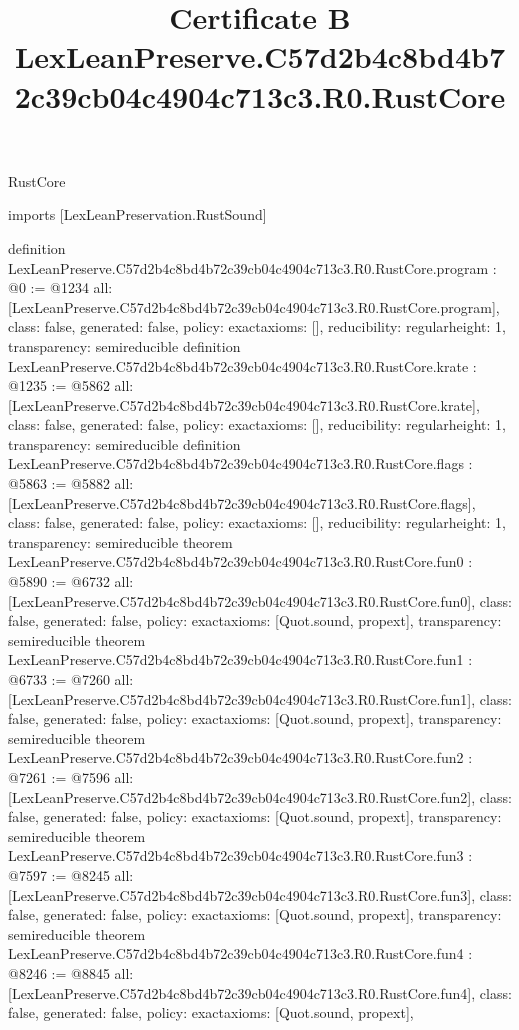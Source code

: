 \begin{lexlean}{RustCore}
\title{Certificate B LexLeanPreserve.C57d2b4c8bd4b72c39cb04c4904c713c3.R0.RustCore}
\begin{coremodule}
imports [LexLeanPreservation.RustSound]

definition LexLeanPreserve.C57d2b4c8bd4b72c39cb04c4904c713c3.R0.RustCore.program : @0 := @1234 {
  all: [LexLeanPreserve.C57d2b4c8bd4b72c39cb04c4904c713c3.R0.RustCore.program],
  class: false,
  generated: false,
  policy: exact{axioms: []},
  reducibility: regular{height: 1},
  transparency: semireducible
}
definition LexLeanPreserve.C57d2b4c8bd4b72c39cb04c4904c713c3.R0.RustCore.krate : @1235 := @5862 {
  all: [LexLeanPreserve.C57d2b4c8bd4b72c39cb04c4904c713c3.R0.RustCore.krate],
  class: false,
  generated: false,
  policy: exact{axioms: []},
  reducibility: regular{height: 1},
  transparency: semireducible
}
definition LexLeanPreserve.C57d2b4c8bd4b72c39cb04c4904c713c3.R0.RustCore.flags : @5863 := @5882 {
  all: [LexLeanPreserve.C57d2b4c8bd4b72c39cb04c4904c713c3.R0.RustCore.flags],
  class: false,
  generated: false,
  policy: exact{axioms: []},
  reducibility: regular{height: 1},
  transparency: semireducible
}
theorem LexLeanPreserve.C57d2b4c8bd4b72c39cb04c4904c713c3.R0.RustCore.fun0 : @5890 := @6732 {
  all: [LexLeanPreserve.C57d2b4c8bd4b72c39cb04c4904c713c3.R0.RustCore.fun0],
  class: false,
  generated: false,
  policy: exact{axioms: [Quot.sound, propext]},
  transparency: semireducible
}
theorem LexLeanPreserve.C57d2b4c8bd4b72c39cb04c4904c713c3.R0.RustCore.fun1 : @6733 := @7260 {
  all: [LexLeanPreserve.C57d2b4c8bd4b72c39cb04c4904c713c3.R0.RustCore.fun1],
  class: false,
  generated: false,
  policy: exact{axioms: [Quot.sound, propext]},
  transparency: semireducible
}
theorem LexLeanPreserve.C57d2b4c8bd4b72c39cb04c4904c713c3.R0.RustCore.fun2 : @7261 := @7596 {
  all: [LexLeanPreserve.C57d2b4c8bd4b72c39cb04c4904c713c3.R0.RustCore.fun2],
  class: false,
  generated: false,
  policy: exact{axioms: [Quot.sound, propext]},
  transparency: semireducible
}
theorem LexLeanPreserve.C57d2b4c8bd4b72c39cb04c4904c713c3.R0.RustCore.fun3 : @7597 := @8245 {
  all: [LexLeanPreserve.C57d2b4c8bd4b72c39cb04c4904c713c3.R0.RustCore.fun3],
  class: false,
  generated: false,
  policy: exact{axioms: [Quot.sound, propext]},
  transparency: semireducible
}
theorem LexLeanPreserve.C57d2b4c8bd4b72c39cb04c4904c713c3.R0.RustCore.fun4 : @8246 := @8845 {
  all: [LexLeanPreserve.C57d2b4c8bd4b72c39cb04c4904c713c3.R0.RustCore.fun4],
  class: false,
  generated: false,
  policy: exact{axioms: [Quot.sound, propext]},
}
\end{coremodule}
\end{lexlean}
